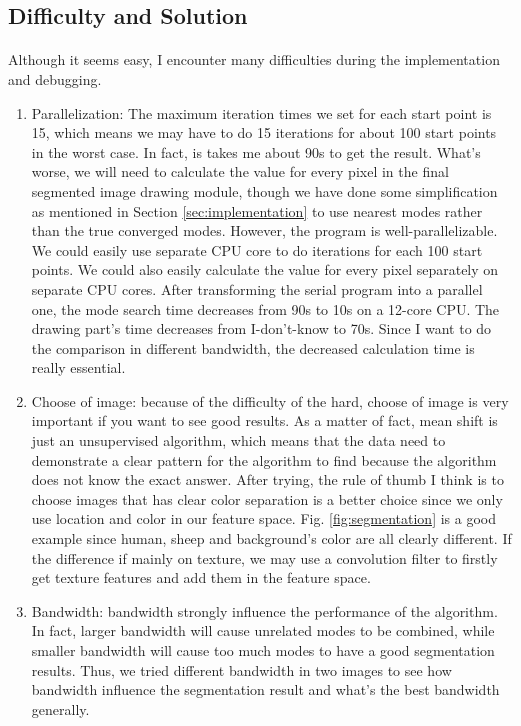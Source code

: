 \documentclass{gapd}
\begin{document}
\subsection{Difficulty and Solution}
\paragraph{}
	Although it seems easy, I encounter many difficulties during the implementation and debugging. 
	\begin{enumerate}
		\item Parallelization: The maximum iteration times we set for each start point is 15, which means we may have to do 15 iterations for about 100 start points in the worst case. In fact, is takes me about 90s to get the result. What's worse, we will need to calculate the value for every pixel in the final segmented image drawing module, though we have done some simplification as mentioned in Section \ref{sec:implementation} to use nearest modes rather than the true converged modes. However, the program is well-parallelizable. We could easily use separate CPU core to do iterations for each 100 start points. We could also easily calculate the value for every pixel separately on separate CPU cores. After transforming the serial program into a parallel one, the mode search time decreases from 90s to 10s on a 12-core CPU. The drawing part's time decreases from I-don't-know to 70s. Since I want to do the comparison in different bandwidth, the decreased calculation time is really essential. 
		\item Choose of image: because of the difficulty of the hard, choose of image is very important if you want to see good results. As a matter of fact, mean shift is just an unsupervised algorithm, which means that the data need to demonstrate a clear pattern for the algorithm to find because the algorithm does not know the exact answer. After trying, the rule of thumb I think is to choose images that has clear color separation is a better choice since we only use location and color in our feature space. Fig. \ref{fig:segmentation} is a good example since human, sheep and background's color are all clearly different. If the difference if mainly on texture, we may use a convolution filter to firstly get texture features and add them in the feature space. 
		\item Bandwidth: bandwidth strongly influence the performance of the algorithm. In fact, larger bandwidth will cause unrelated modes to be combined, while smaller bandwidth will cause too much modes to have a good segmentation results. Thus, we tried different bandwidth in two images to see how bandwidth influence the segmentation result and what's the best bandwidth generally. 
	\end{enumerate}
	
\end{document}
